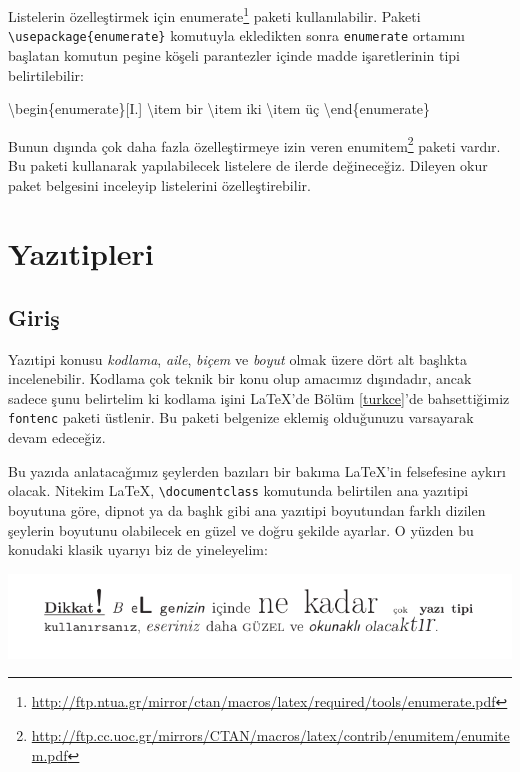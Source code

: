 \documentclass[
  10pt,
]{scrbook}
\newenvironment{Shaded}{\begin{snugshade}}{\end{snugshade}}
\newcommand{\NormalTok}[1]{#1}
\renewcommand{\href}[2]{#2\footnote{\url{#1}}}
\begin{document}
Listelerin özelleştirmek için
\href{http://ftp.ntua.gr/mirror/ctan/macros/latex/required/tools/enumerate.pdf}{enumerate} paketi kullanılabilir. Paketi \texttt{\textbackslash{}usepackage\{enumerate\}}
komutuyla ekledikten sonra \texttt{enumerate} ortamını başlatan komutun peşine
köşeli parantezler içinde madde işaretlerinin tipi belirtilebilir:

\begin{Shaded}
\begin{Highlighting}[]
\NormalTok{\textbackslash{}begin\{enumerate\}[I.]}
\NormalTok{\textbackslash{}item bir}
\NormalTok{\textbackslash{}item iki }
\NormalTok{\textbackslash{}item üç}
\NormalTok{\textbackslash{}end\{enumerate\}}
\end{Highlighting}
\end{Shaded}

Bunun dışında çok daha fazla özelleştirmeye izin veren
\href{http://ftp.cc.uoc.gr/mirrors/CTAN/macros/latex/contrib/enumitem/enumitem.pdf}{enumitem} paketi vardır. Bu paketi kullanarak yapılabilecek
listelere de ilerde değineceğiz. Dileyen okur paket belgesini inceleyip
listelerini özelleştirebilir.

\hypertarget{yazux131tipleri}{%
\section{Yazıtipleri}\label{yazux131tipleri}}

\hypertarget{giriux15f}{%
\subsection{Giriş}\label{giriux15f}}

Yazıtipi konusu \emph{kodlama}, \emph{aile}, \emph{biçem} ve \emph{boyut} olmak üzere dört
alt başlıkta incelenebilir. Kodlama çok teknik bir konu olup amacımız
dışındadır, ancak sadece şunu belirtelim ki kodlama işini LaTeX'de Bölüm \ref{turkce}'de bahsettiğimiz \texttt{fontenc} paketi üstlenir. Bu paketi belgenize eklemiş
olduğunuzu varsayarak devam edeceğiz.

Bu yazıda anlatacağımız şeylerden bazıları bir bakıma LaTeX'in
felsefesine aykırı olacak. Nitekim LaTeX, \texttt{\textbackslash{}documentclass} komutunda
belirtilen ana yazıtipi boyutuna göre, dipnot ya da başlık gibi ana
yazıtipi boyutundan farklı dizilen şeylerin boyutunu olabilecek en güzel
ve doğru şekilde ayarlar. O yüzden bu konudaki klasik uyarıyı biz de
yineleyelim:

\includegraphics{images/uyari.png}
\end{document}
